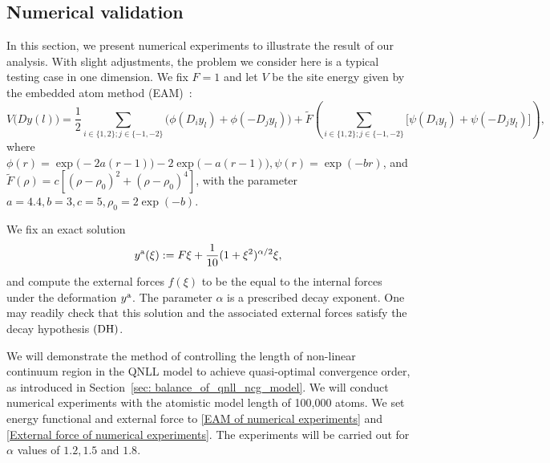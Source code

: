 \subsection{Numerical validation}
\label{sec: experiments_qnll_ncg}

In this section, we present numerical experiments to illustrate the result of our analysis. With slight adjustments, the problem we consider here is a typical testing case in one dimension. We fix $F=1$ and let $V$ be the site energy given by the embedded atom method (EAM)~\cite{1984_Daw_Baskes_EAM_PRB}:
\begin{equation}\label{EAM of numerical experiments}
	V\big(Dy(l)\big)=\frac{1}{2} \sum_{i\in\{1,2\};j\in\{-1,-2\}}\big(\phi(D_{i}y_{l})+\phi(-D_{j}y_{l})\big)+\widetilde{F}\left(\sum_{i\in\{1,2\};j\in\{-1,-2\}}\big[\psi(D_{i}y_{l})+\psi(-D_{j}y_{l})\big]\right),
\end{equation}
where $\phi(r) = \exp\big(-2a(r-1)\big)-2\exp\big(-a(r-1)\big), \psi(r) = \exp(-br)$, and $\tilde{F}(\rho) = c[(\rho-\rho_{0})^{2}+(\rho-\rho_{0})^{4}]$, with the parameter $a=4.4, b=3, c=5,\rho_{0} =2\exp(-b)$.

We fix an exact solution
\begin{equation}\label{External force of numerical experiments}
	y^{{\rm a}}(\xi):=F\xi + \frac{1}{10}(1+\xi^2)^{\alpha/2}\xi,
\end{equation}
and compute the external forces $f(\xi)$ to be the equal to the internal forces under the deformation $y^{{\rm a}}$. The parameter $\alpha$ is a prescribed decay exponent. One may readily check that this solution and the associated external forces satisfy the decay hypothesis $\textbf{\rm (DH)}$.


We will demonstrate the method of controlling the length of non-linear continuum region in the QNLL model to achieve quasi-optimal convergence order, as introduced in Section~\ref{sec: balance_of_qnll_ncg_model}. We will conduct numerical experiments with the atomistic model length of 100,000 atoms. We set energy functional and external force to \eqref{EAM of numerical experiments} and \eqref{External force of numerical experiments}. The experiments will be carried out for $\alpha$ values of $1.2, 1.5$ and $1.8$.

